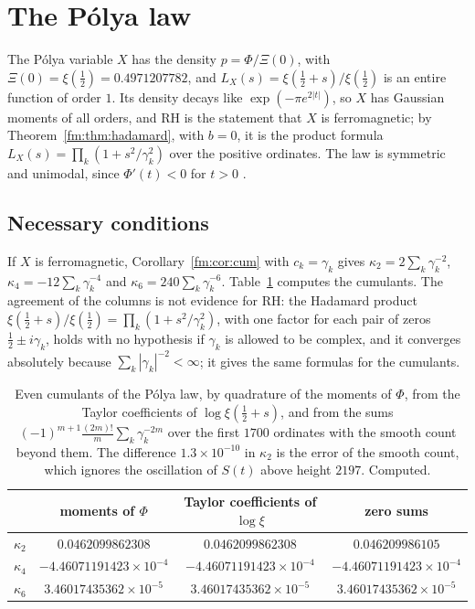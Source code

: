 \section{The P\'olya law}\label{ch:fmpolya}

The P\'olya variable $X$ has the density $p=\Phi/\Xi(0)$, with $\Xi(0)=\xi(\frac12)=0.4971207782$, and $L_X(s)=\xi(\frac12+s)/\xi(\frac12)$ is an entire function of order $1$. Its density decays like $\exp(-\pi e^{2|t|})$, so $X$ has Gaussian moments of all orders, and RH is the statement that $X$ is ferromagnetic; by Theorem~\ref{fm:thm:hadamard}, with $b=0$, it is the product formula $L_X(s)=\prod_k(1+s^2/\gamma_k^2)$ over the positive ordinates. The law is symmetric and unimodal, since $\Phi'(t)<0$ for $t>0$ \cite[Theorem A]{CNV86}.

\subsection{Necessary conditions}\label{fm:sec:polyanec}

If $X$ is ferromagnetic, Corollary~\ref{fm:cor:cum} with $c_k=\gamma_k$ gives $\kappa_2=2\sum_k\gamma_k^{-2}$, $\kappa_4=-12\sum_k\gamma_k^{-4}$ and $\kappa_6=240\sum_k\gamma_k^{-6}$. Table~\ref{fm:tab:cum} computes the cumulants. The agreement of the columns is not evidence for RH: the Hadamard product $\xi(\frac12+s)/\xi(\frac12)=\prod_k(1+s^2/\gamma_k^2)$, with one factor for each pair of zeros $\frac12\pm i\gamma_k$, holds with no hypothesis if $\gamma_k$ is allowed to be complex, and it converges absolutely because $\sum_k|\gamma_k|^{-2}<\infty$; it gives the same formulas for the cumulants.

\begin{table}[htbp]
\centering\small
\begin{tabular}{@{}lccc@{}}
\toprule
& moments of $\Phi$ & Taylor coefficients of $\log\xi$ & zero sums\\
\midrule
$\kappa_2$ & $0.0462099862308$ & $0.0462099862308$ & $0.046209986105$\\
$\kappa_4$ & $-4.46071191423\times10^{-4}$ & $-4.46071191423\times10^{-4}$ & $-4.46071191423\times10^{-4}$\\
$\kappa_6$ & $3.46017435362\times10^{-5}$ & $3.46017435362\times10^{-5}$ & $3.46017435362\times10^{-5}$\\
\bottomrule
\end{tabular}
\caption{Even cumulants of the P\'olya law, by quadrature of the moments of $\Phi$, from the Taylor coefficients of $\log\xi(\frac12+s)$, and from the sums $(-1)^{m+1}\frac{(2m)!}m\sum_k\gamma_k^{-2m}$ over the first $1700$ ordinates with the smooth count beyond them. The difference $1.3\times10^{-10}$ in $\kappa_2$ is the error of the smooth count, which ignores the oscillation of $S(t)$ above height $2197$. Computed.}
\label{fm:tab:cum}
\end{table}


